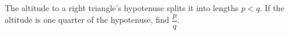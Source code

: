 The altitude to a right triangle's hypotenuse splits it into lengths $p<q$. If the altitude is one quarter of the hypotenuse, find $\dfrac{p}{q}$.
